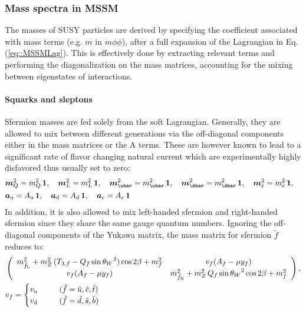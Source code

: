 \subsubsection{Mass spectra in MSSM}

The masses of SUSY particles are derived by specifying the coefficient associated with mass terms (e.g. $m$ in $m\phi\phi$), after a full expansion of the Lagrangian in Eq. (\ref{eq::MSSMLag}). This is effectively done by extracting relevant terms and performing the diagonalization on the mass matrices, accounting for the mixing between eigenstates of interactions. \\

\paragraph{Squarks and sleptons}
Sfermion masses are fed solely from the soft Lagrangian. Generally, they are allowed to mix between different generations via the off-diagonal components either in the mass matrices or the A terms. These are however known to lead to a significant rate of flavor changing natural current which are experimentally highly disfavored thus usually set to zero:
\begin{align}
&  \bm{m}^2_{Q}    = m^2_{Q} \,    \bm{1}, \,\,\,\,\,\,
  \bm{m}_{L}^2    = m_{L}^2 \,    \bm{1}, \,\,\,\,\,\,
  \bm{m}_{\ubar}^2 = m_{\ubar}^2 \, \bm{1}, \,\,\,\,\,\,
  \bm{m}_{\dbar}^2 = m_{\dbar}^2 \, \bm{1}, \,\,\,\,\,\,
  \bm{m}_{\ebar}^2 = m_{\ebar}^2 \, \bm{1}, \,\,\,\,\,\, \nn \\
%
& \bm{a}_\mup = A_\mup \, \bm{1}, \,\,\,\,\,\,
  \bm{a}_\mdn = A_\mdn \, \bm{1}, \,\,\,\,\,\,
  \bm{a}_e    = A_e \, \bm{1}
\end{align}
In addition, it is also allowed to mix left-handed sfermion and right-handed sfermion since they share the same gauge quantum numbers. Ignoring the off-diagonal components of the Yukawa matrix, the mass matrix for sfermion $\tilde{f}$ reduces to:
\begin{align}
& \left(  
  \begin{array}{cc}
    m^2_{\tilde{f}_{\mL}} + m_Z^2 \,(T_{3,f}-Q_f\sin{\theta_W}^2) \cos{2\beta} + m^2_f    &  v_f ( A_f - \mu y_f)         \\
    v_f ( A_f - \mu y_f)                &     m^2_{\tilde{f}_{\mR}} + m_Z^2 \, Q_f\sin{\theta_W}^2\cos{2\beta} + m^2_f    
  \end{array} 
\right), \nn  \\
%
& v_f = \begin{cases}
  v_{\mup} \mbox{\phantom{MMM}} (\tilde{f}=\tilde{u}, \tilde{c}, \tilde{t}) \\
  v_{\mdn} \mbox{\phantom{MMM}} (\tilde{f}=\tilde{d}, \tilde{s}, \tilde{b}) 
     \end{cases}
%
\end{align}
